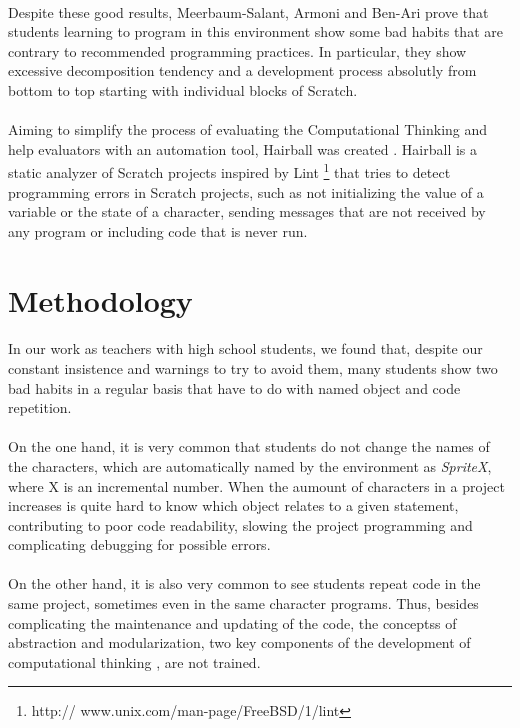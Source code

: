 \documentclass[a4paper,10pt]{article}
\begin{document}
\paragraph{}Despite these good results, Meerbaum-Salant, Armoni and Ben-Ari \cite{meerbaum2011habits} prove that students learning to program in this environment show some bad habits that are contrary to recommended programming practices. In particular, they show excessive decomposition tendency and a development process absolutly from bottom to top starting with individual blocks of Scratch.
\paragraph{} Aiming to simplify the process of evaluating the Computational Thinking and help evaluators with an automation tool, Hairball was created \cite{boe2013hairball}. Hairball is a static analyzer of Scratch projects inspired by Lint \footnote{http:// www.unix.com/man-page/FreeBSD/1/lint} that tries to detect programming errors in Scratch projects, such as not initializing the value of a variable or the state of a character, sending messages that are not received by any program or including code that is never run.

\section{Methodology}

\paragraph{}In our work as teachers with high school students, we found that, despite our constant insistence and warnings to try to avoid them, many students show two bad habits in a regular basis that have to do with named object and code repetition.

\paragraph{}On the one hand, it is very common that students do not change the names of the characters, which are automatically named by the environment as \textit{SpriteX}, where X is an incremental number. When the aumount of characters in a project increases is quite hard to know which object relates to a given statement, contributing to poor code readability, slowing the project programming and complicating debugging for possible errors.
\paragraph{}On the other hand, it is also very common to see students repeat code in the same project, sometimes even in the same character programs. Thus, besides complicating the maintenance and updating of the code, the conceptss of abstraction and modularization, two key components of the development of computational thinking \cite{wing2008computational}, are not trained.
\end{document}
